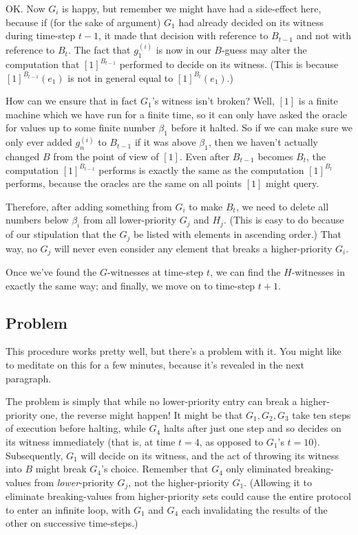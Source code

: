 \documentclass[11pt]{amsart}
\begin{document}
OK. Now $G_i$ is happy, but remember we might have had a side-effect here, because if (for the sake of argument) $G_1$ had already decided on its witness during time-step $t-1$, it made that decision with reference to $B_{t-1}$ and not with reference to $B_t$.
The fact that $g^{(i)}_1$ is now in our $B$-guess may alter the computation that $[1]^{B_{t-1}}$ performed to decide on its witness.
(This is because $[1]^{B_{t-1}}(e_1)$ is not in general equal to $[1]^{B_t}(e_1)$.)

How can we ensure that in fact $G_1$'s witness isn't broken?
Well, $[1]$ is a finite machine which we have run for a finite time, so it can only have asked the oracle for values up to some finite number $\beta_1$ before it halted.
So if we can make sure we only ever added $g^{(i)}_n$ to $B_{t-1}$ if it was above $\beta_1$, then we haven't actually changed $B$ from the point of view of $[1]$.
Even after $B_{t-1}$ becomes $B_t$, the computation $[1]^{B_{t-1}}$ performs is exactly the same as the computation $[1]^{B_t}$ performs, because the oracles are the same on all points $[1]$ might query.

Therefore, after adding something from $G_i$ to make $B_t$, we need to delete all numbers below $\beta_i$ from all lower-priority $G_j$ and $H_j$.
(This is easy to do because of our stipulation that the $G_j$ be listed with elements in ascending order.)
That way, no $G_j$ will never even consider any element that breaks a higher-priority $G_i$.

Once we've found the $G$-witnesses at time-step $t$, we can find the $H$-witnesses in exactly the same way; and finally, we move on to time-step $t+1$.

\subsection{Problem} This procedure works pretty well, but there's a problem with it. You might like to meditate on this for a few minutes, because it's revealed in the next paragraph.

The problem is simply that while no lower-priority entry can break a higher-priority one, the reverse might happen!
It might be that $G_1, G_2, G_3$ take ten steps of execution before halting, while $G_4$ halts after just one step and so decides on its witness immediately (that is, at time $t=4$, as opposed to $G_1$'s $t=10$).
Subsequently, $G_1$ will decide on its witness, and the act of throwing its witness into $B$ might break $G_4$'s choice.
Remember that $G_4$ only eliminated breaking-values from \emph{lower}-priority $G_j$, not the higher-priority $G_1$.
(Allowing it to eliminate breaking-values from higher-priority sets could cause the entire protocol to enter an infinite loop, with $G_1$ and $G_4$ each invalidating the results of the other on successive time-steps.)
\end{document}
